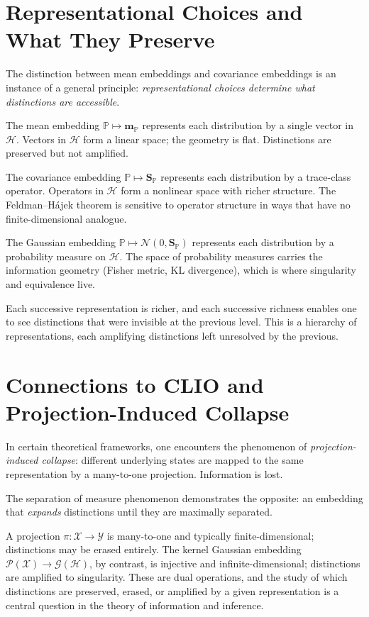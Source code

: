 \documentclass[12pt, oneside]{book}
\theoremstyle{plain}
\theoremstyle{definition}
\newcommand{\calH}{\mathcal{H}}
\newcommand{\calX}{\mathcal{X}}
\newcommand{\calP}{\mathcal{P}}
\newcommand{\calN}{\mathcal{N}}
\newcommand{\PP}{\mathbb{P}}
\newcommand{\mP}{\mathbf{m}_{\PP}}
\newcommand{\SP}{\mathbf{S}_{\PP}}
\newcommand{\calG}{\mathcal{G}}
\newcommand{\calY}{\mathcal{Y}}
\begin{document}
\section{Representational Choices and What They Preserve}

The distinction between mean embeddings and covariance embeddings is an instance of a general principle: \emph{representational choices determine what distinctions are accessible}.

The mean embedding $\PP \mapsto \mP$ represents each distribution by a single vector in $\calH$. Vectors in $\calH$ form a linear space; the geometry is flat. Distinctions are preserved but not amplified.

The covariance embedding $\PP \mapsto \SP$ represents each distribution by a trace-class operator. Operators in $\calH$ form a nonlinear space with richer structure. The Feldman--H\'ajek theorem is sensitive to operator structure in ways that have no finite-dimensional analogue.

The Gaussian embedding $\PP \mapsto \calN(0, \SP)$ represents each distribution by a probability measure on $\calH$. The space of probability measures carries the information geometry (Fisher metric, KL divergence), which is where singularity and equivalence live.

Each successive representation is richer, and each successive richness enables one to see distinctions that were invisible at the previous level. This is a hierarchy of representations, each amplifying distinctions left unresolved by the previous.

\section{Connections to CLIO and Projection-Induced Collapse}

In certain theoretical frameworks, one encounters the phenomenon of \emph{projection-induced collapse}: different underlying states are mapped to the same representation by a many-to-one projection. Information is lost.

The separation of measure phenomenon demonstrates the opposite: an embedding that \emph{expands} distinctions until they are maximally separated.

A projection $\pi: \calX \to \calY$ is many-to-one and typically finite-dimensional; distinctions may be erased entirely. The kernel Gaussian embedding $\calP(\calX) \to \calG(\calH)$, by contrast, is injective and infinite-dimensional; distinctions are amplified to singularity. These are dual operations, and the study of which distinctions are preserved, erased, or amplified by a given representation is a central question in the theory of information and inference.
\end{document}
